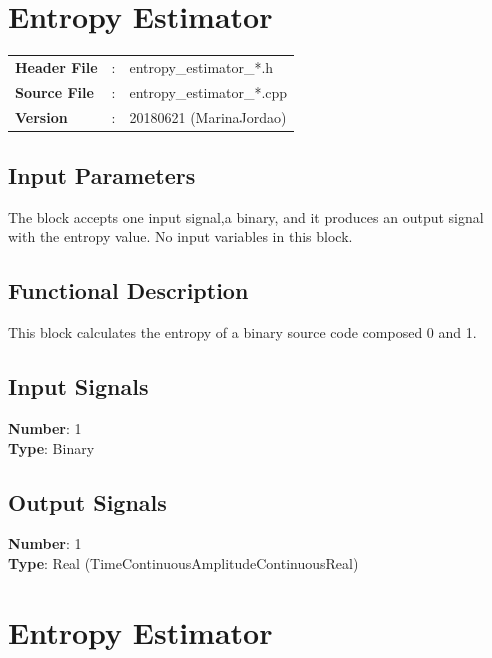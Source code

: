 \clearpage

\section{Entropy Estimator}

\begin{tcolorbox}	
\begin{tabular}{p{2.75cm} p{0.2cm} p{10.5cm}} 	
\textbf{Header File}   &:& entropy\_estimator\_*.h \\
\textbf{Source File}   &:& entropy\_estimator\_*.cpp \\
\textbf{Version}       &:& 20180621 (MarinaJordao)
\end{tabular}
\end{tcolorbox}

\subsection*{Input Parameters}

The block accepts one input signal,a binary, and it produces an output signal with the entropy value.
No input variables in this block.


\subsection*{Functional Description}


This block calculates the entropy of a binary source code composed 0 and 1.
\subsection*{Input Signals}

\textbf{Number}: 1\\
\textbf{Type}: Binary

\subsection*{Output Signals}

\textbf{Number}: 1\\
\textbf{Type}: Real (TimeContinuousAmplitudeContinuousReal)
%


\clearpage

\section{Entropy Estimator}

\maketitle


